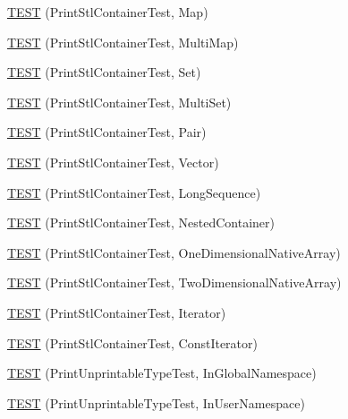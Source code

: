 \begin{DoxyCompactItemize}
\item 
\hyperlink{namespacetesting_1_1gtest__printers__test_a3d701a1866f260a42411e9041894c49c}{T\-E\-S\-T} (Print\-Stl\-Container\-Test, Map)
\item 
\hyperlink{namespacetesting_1_1gtest__printers__test_a8a498c956a5b1c0358d126e1ad56fac0}{T\-E\-S\-T} (Print\-Stl\-Container\-Test, Multi\-Map)
\item 
\hyperlink{namespacetesting_1_1gtest__printers__test_abdc498462741033074f8e86b7c0bd480}{T\-E\-S\-T} (Print\-Stl\-Container\-Test, Set)
\item 
\hyperlink{namespacetesting_1_1gtest__printers__test_adaa3e1cfa3feca377b3958edb41fc0f1}{T\-E\-S\-T} (Print\-Stl\-Container\-Test, Multi\-Set)
\item 
\hyperlink{namespacetesting_1_1gtest__printers__test_ad5d3e873b00c1c9e3f5924e106dd7831}{T\-E\-S\-T} (Print\-Stl\-Container\-Test, Pair)
\item 
\hyperlink{namespacetesting_1_1gtest__printers__test_abfab1ea62f0285c0cdbcca500be0dac8}{T\-E\-S\-T} (Print\-Stl\-Container\-Test, Vector)
\item 
\hyperlink{namespacetesting_1_1gtest__printers__test_a55eca253f3365ad26183bcc711cb257a}{T\-E\-S\-T} (Print\-Stl\-Container\-Test, Long\-Sequence)
\item 
\hyperlink{namespacetesting_1_1gtest__printers__test_ad8fb463805baecdfb95154dec6ec4f27}{T\-E\-S\-T} (Print\-Stl\-Container\-Test, Nested\-Container)
\item 
\hyperlink{namespacetesting_1_1gtest__printers__test_a6dd59bbdea483f662fe62e2c55c106ce}{T\-E\-S\-T} (Print\-Stl\-Container\-Test, One\-Dimensional\-Native\-Array)
\item 
\hyperlink{namespacetesting_1_1gtest__printers__test_aca371c218e2248562ed258eaf385f4d1}{T\-E\-S\-T} (Print\-Stl\-Container\-Test, Two\-Dimensional\-Native\-Array)
\item 
\hyperlink{namespacetesting_1_1gtest__printers__test_a01ec32faf0032f9fbcf4895d8d6e4aa9}{T\-E\-S\-T} (Print\-Stl\-Container\-Test, Iterator)
\item 
\hyperlink{namespacetesting_1_1gtest__printers__test_a3b54f9a039804190b7ff2e818169c0f2}{T\-E\-S\-T} (Print\-Stl\-Container\-Test, Const\-Iterator)
\item 
\hyperlink{namespacetesting_1_1gtest__printers__test_a805264fd24de8e65cba977a798abc54c}{T\-E\-S\-T} (Print\-Unprintable\-Type\-Test, In\-Global\-Namespace)
\item 
\hyperlink{namespacetesting_1_1gtest__printers__test_a0aa1499e978bdde6c71e49ecc9db695b}{T\-E\-S\-T} (Print\-Unprintable\-Type\-Test, In\-User\-Namespace)

\end{DoxyCompactItemize}
